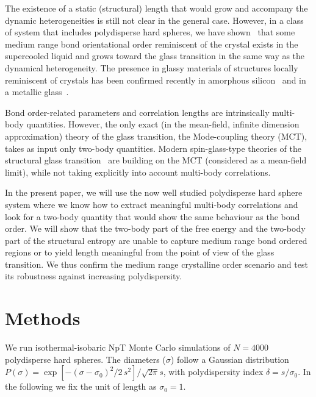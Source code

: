 \documentclass[twocolumn,superscriptaddress]{revtex4-1}
\begin{document}
The existence of a static (structural) length that would grow and accompany the dynamic heterogeneities is still not clear in the general case. However, in a class of system that includes polydisperse hard spheres, we have shown~\cite{tanaka} that some medium range bond orientational order reminiscent of the crystal exists in the supercooled liquid and grows toward the glass transition in the same way as the dynamical heterogeneity. The presence in glassy materials of structures locally reminiscent of crystals has been confirmed recently in amorphous silicon~\cite{Treacy2012} and in a metallic glass~\cite{Hwang2012}.

Bond order-related parameters and correlation lengths are intrinsically multi-body quantities. However, the only exact (in the mean-field, infinite dimension approximation) theory of the glass transition, the Mode-coupling theory (MCT), takes as input only two-body quantities. Modern spin-glass-type theories of the structural glass transition~\cite{lubchenko2007,Biroli2008,Parisi2010} are building on the MCT (considered as a mean-field limit), while not taking explicitly into account multi-body correlations.

In the present paper, we will use the now well studied polydisperse hard sphere system where we know how to extract meaningful multi-body correlations and look for a two-body quantity that would show the same behaviour as the bond order. We will show that the two-body part of the free energy and the two-body part of the structural entropy are unable to capture medium range bond ordered regions or to yield length meaningful from the point of view of the glass transition. We thus confirm the medium range crystalline order scenario and test its robustness against increasing polydispersity.


\section{Methods}
We run isothermal-isobaric NpT Monte Carlo simulations of $N=4000$ polydisperse hard spheres.
The diameters ($\sigma$) follow a Gaussian distribution $P(\sigma)=\exp{\left[-(\sigma-\sigma_0)^2/2\,s^2\right]}/\sqrt{2\pi} s$,
with polydispersity index $\delta=s/\sigma_0$. In the following we fix the unit of length as $\sigma_0=1$.
\end{document}
